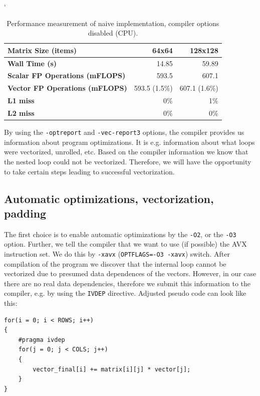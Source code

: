 \begin{table}[ht]
\catcode`
\begin{center}
\begin{tabular}{| l | r | r |} \hline
\textbf{Matrix Size (items)} & 64x64 & 128x128\\ \hline
\textbf{Wall Time (s)} & 14.85 & 59.89\\ \hline
\textbf{Scalar FP Operations (mFLOPS)} & 593.5 & 607.1\\ \hline
\textbf{Vector FP Operations (mFLOPS)} & 593.5 (1.5\%) & 607.1 (1.6\%)\\ \hline
\textbf{L1 miss} & 0\% & 1\%\\ \hline
\textbf{L2 miss} & 0\% & 0\%\\ \hline
\end{tabular}
\caption{Performance measurement of naive implementation, compiler options disabled (CPU).}
\label{tab:table_matvec_naive}
\end{center}
\end{table}

By using the \texttt{-optreport} and \texttt{-vec-report3} options, the compiler provides us information about program optimizations. It is e.g. information about what loops were vectorized, unrolled, etc. Based on the compiler information we know that the nested loop could not be vectorized. Therefore, we will have the opportunity to take certain steps leading to successful vectorization.

\subsection{Automatic optimizations, vectorization, padding}
The first choice is to enable automatic optimizations by the \texttt{-O2}, or the \texttt{-O3} option. Further, we tell the compiler that we want to use (if possible) the AVX instruction set. We do this by \texttt{-xavx} (\texttt{OPTFLAGS=-O3 -xavx}) switch. After compilation of the program we discover that the internal loop cannot be vectorized due to presumed data dependences of the vectors. However, in our case there are no real data dependencies, therefore we submit this information to the compiler, e.g. by using the \texttt{IVDEP} directive. Adjusted pseudo code can look like this:

\bigskip
\begin{lstlisting}[caption={Matrix and vector multiplication pseudo code, IVDEP directive.}, captionpos=b, label=code_matvec_ivdep]
for(i = 0; i < ROWS; i++)
{
    #pragma ivdep
    for(j = 0; j < COLS; j++)
    {    
        vector_final[i] += matrix[i][j] * vector[j];
    }
}
\end{lstlisting}
\bigskip


